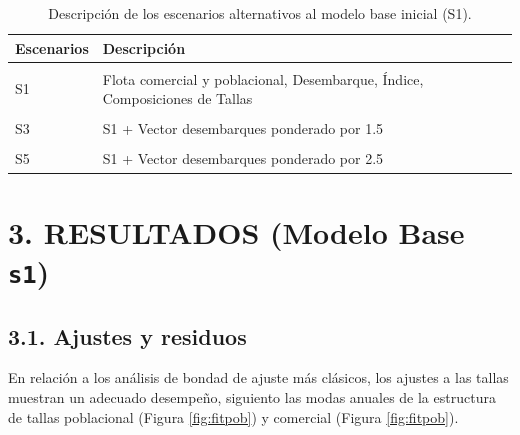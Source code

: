 \documentclass[
]{article}
\begin{document}
\begin{table}[h!]

\caption{\label{tab:unnamed-chunk-9}\label{Tab2}Descripción de los escenarios alternativos al modelo base inicial (S1).}
\centering
\fontsize{10}{12}\selectfont
\begin{tabular}[t]{ll}
\toprule
Escenarios & Descripción\\
\midrule
\cellcolor{gray!6}{S01} & \cellcolor{gray!6}{Solo Desembarque e Índice}\\
S1 & Flota comercial y poblacional, Desembarque, Índice, Composiciones de Tallas\\
\cellcolor{gray!6}{S2} & \cellcolor{gray!6}{S1 + Vector Desembarques desde 1990 asumido en 250 por año}\\
S3 & S1 + Vector desembarques ponderado por 1.5\\
\cellcolor{gray!6}{S4} & \cellcolor{gray!6}{S1 + Vector desembarques ponderado por 2}\\
\addlinespace
S5 & S1 + Vector desembarques ponderado por 2.5\\
\bottomrule
\end{tabular}
\end{table}

\pagebreak

\hypertarget{resultados-modelo-base-s1}{%
\section{\texorpdfstring{3. RESULTADOS (Modelo Base \texttt{s1})}{3. RESULTADOS (Modelo Base s1)}}\label{resultados-modelo-base-s1}}

\hypertarget{ajustes-y-residuos}{%
\subsection{3.1. Ajustes y residuos}\label{ajustes-y-residuos}}

En relación a los análisis de bondad de ajuste más clásicos, los ajustes a las tallas muestran un adecuado desempeño, siguiento las modas anuales de la estructura de tallas poblacional (Figura \ref{fig:fitpob}) y comercial (Figura \ref{fig:fitpob}).
\end{document}
